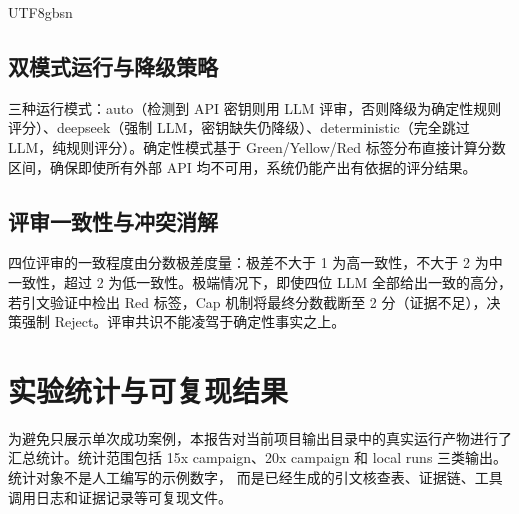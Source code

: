 \documentclass[11pt,a4paper]{article}
\begin{document}
\begin{CJK*}{UTF8}{gbsn}
\subsection{双模式运行与降级策略}

三种运行模式：auto（检测到 API 密钥则用 LLM 评审，否则降级为确定性规则评分）、deepseek（强制 LLM，密钥缺失仍降级）、deterministic（完全跳过 LLM，纯规则评分）。确定性模式基于 Green/Yellow/Red 标签分布直接计算分数区间，确保即使所有外部 API 均不可用，系统仍能产出有依据的评分结果。

\subsection{评审一致性与冲突消解}

四位评审的一致程度由分数极差度量：极差不大于 1 为高一致性，不大于 2 为中一致性，超过 2 为低一致性。极端情况下，即使四位 LLM 全部给出一致的高分，若引文验证中检出 Red 标签，Cap 机制将最终分数截断至 2 分（证据不足），决策强制 Reject。评审共识不能凌驾于确定性事实之上。

\section{实验统计与可复现结果}

为避免只展示单次成功案例，本报告对当前项目输出目录中的真实运行产物进行了汇总统计。统计范围包括
15x campaign、20x campaign 和 local runs 三类输出。统计对象不是人工编写的示例数字，
而是已经生成的引文核查表、证据链、工具调用日志和证据记录等可复现文件。


\end{CJK*}
\end{document}
